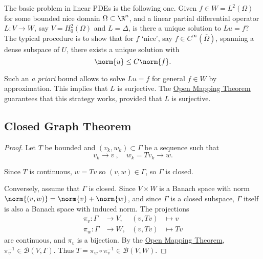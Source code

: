 \documentclass{article}
\begin{document}
\begin{remark}
    The basic problem in linear PDEs is the following one.
    Given $f \in W = L^2 (\Omega)$ for some bounded nice domain $\Omega \subset \R^n$, and a linear partial differential operator $L: V \to W$, say $V = H_0^2(\Omega)$ and $L = \Delta$, is there a unique solution to $Lu = f$?
    The typical procedure is to show that for $f$ `nice', say $f \in C^\infty(\overline{\Omega})$, spanning a dense subspace of $U$, there exists a unique solution with
    \begin{equation*}\norm{u} \leq C \norm{f}.\end{equation*}

    Such an \emph{a priori} bound allows to solve $L u = f$ for general $f \in W$ by approximation.
    This implies that $L$ is surjective.
    The \hyperlink{thm:omt}{Open Mapping Theorem} guarantees that this strategy works, provided that $L$ is surjective.
\end{remark}

\subsection{Closed Graph Theorem}

\begin{proof}
    Let $T$ be bounded and $(v_k, w_k) \subset \Gamma$ be a sequence such that
    \begin{equation*}
        v_k \to v \ , \quad w_k = Tv_k \to w.
    \end{equation*}

    Since $T$ is continuous, $w = Tv$ so $(v, w) \in \Gamma$, so $\Gamma$ is closed.

    Conversely, assume that $\Gamma$ is closed.
    Since $V \times W$ is a Banach space with norm $\norm{(v, w)} = \norm{v} + \norm{w}$, and since $\Gamma$ is a closed subspace, $\Gamma$ itself is also a Banach space with induced norm.
    The projections
    \begin{align*}
        \pi_v: \Gamma &\to V, & (v, Tv) &\mapsto v \\
        \pi_w: \Gamma &\to W, & (v, Tv) &\mapsto Tv
    \end{align*}
    are continuous, and $\pi_v$ is a bijection. By the \hyperlink{thm:omt}{Open Mapping Theorem}, $\pi_v^{-1} \in \mathcal{B}(V, \Gamma)$.
    Thus $T = \pi_w \circ \pi_v^{-1} \in \mathcal{B}(V, W)$.
\end{proof}
\end{document}
